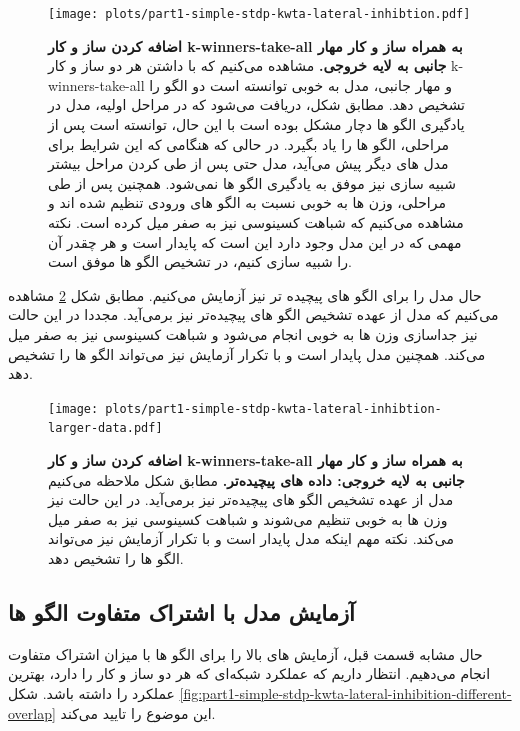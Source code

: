     \begin{figure}[!ht]
        \centering
        \texttt{[image: plots/part1-simple-stdp-kwta-lateral-inhibtion.pdf]} 
        \captionsetup{width=.95\linewidth}
        \caption{\textbf{اضافه کردن ساز و کار 
        k-winners-take-all
        به همراه ساز و کار مهار جانبی به لایه خروجی. } 
        مشاهده می‌کنیم که با داشتن هر دو ساز و کار 
        k-winners-take-all 
        و مهار جانبی، مدل به خوبی توانسته است دو الگو را تشخیص دهد. مطابق شکل، دریافت می‌شود که در مراحل اولیه، مدل در یادگیری الگو ها دچار مشکل بوده است با این حال، توانسته است پس از مراحلی، الگو ها را یاد بگیرد. در حالی که هنگامی که این شرایط برای مدل های دیگر پیش می‌آید، مدل حتی پس از طی کردن مراحل بیشتر شبیه سازی نیز موفق به یادگیری الگو ها نمی‌شود. همچنین پس از طی مراحلی، وزن ها به خوبی نسبت به الگو های ورودی تنظیم شده اند و مشاهده می‌کنیم که شباهت کسینوسی نیز به صفر میل کرده است. نکته مهمی که در این مدل وجود دارد این است که پایدار است و هر چقدر آن را شبیه سازی کنیم، در تشخیص الگو ها موفق است.
        }
        \label{fig:part1-simple-stdp-kwta-lateral-inhibtion}
    \end{figure}

    حال مدل را برای الگو های پیچیده تر نیز آزمایش می‌کنیم. مطابق شکل 
    \ref{fig:part1-simple-stdp-kwta-lateral-inhibtion-larger-data}
    مشاهده می‌کنیم که مدل از عهده تشخیص الگو های پیچیده‌تر نیز برمی‌آید. مجددا در این حالت نیز جداسازی وزن ها به خوبی انجام می‌شود و شباهت کسینوسی نیز به صفر میل می‌کند. همچنین مدل پایدار است و با تکرار آزمایش نیز می‌تواند الگو ها را تشخیص دهد.

    \begin{figure}[!ht]
        \centering
        \texttt{[image: plots/part1-simple-stdp-kwta-lateral-inhibtion-larger-data.pdf]} 
        \captionsetup{width=.85\linewidth}
        \caption{\textbf{اضافه کردن ساز و کار 
        k-winners-take-all
        به همراه ساز و کار مهار جانبی به لایه خروجی: داده های پیچیده‌تر. } 
        مطابق شکل ملاحظه می‌کنیم مدل از عهده تشخیص الگو های پیچیده‌تر نیز برمی‌آید. در این حالت نیز وزن ها به خوبی تنظیم می‌شوند و شباهت کسینوسی نیز به صفر میل می‌کند. نکته مهم اینکه مدل پایدار است و با تکرار آزمایش نیز می‌تواند الگو ها را تشخیص دهد. 
        }
        \label{fig:part1-simple-stdp-kwta-lateral-inhibtion-larger-data}
    \end{figure}

    \subsection{آزمایش مدل با اشتراک متفاوت الگو ها}
        حال مشابه قسمت قبل، آزمایش های بالا را برای الگو ها با میزان اشتراک متفاوت انجام می‌دهیم. انتظار داریم که عملکرد شبکه‌ای که هر دو ساز و کار را دارد، بهترین عملکرد را داشته باشد. شکل 
        \ref{fig:part1-simple-stdp-kwta-lateral-inhibition-different-overlap}
        این موضوع را تایید می‌کند.

